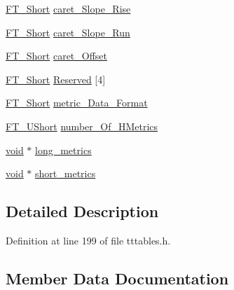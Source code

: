 \begin{DoxyCompactItemize}
\mbox{\hyperlink{fttypes_8h_aa7279be89046a2563cd3d4d6651fbdcf}{F\+T\+\_\+\+Short}} \mbox{\hyperlink{struct_t_t___hori_header___aeb43d92f56de424d8f28bd389973eca4}{caret\+\_\+\+Slope\+\_\+\+Rise}}
\item 
\mbox{\hyperlink{fttypes_8h_aa7279be89046a2563cd3d4d6651fbdcf}{F\+T\+\_\+\+Short}} \mbox{\hyperlink{struct_t_t___hori_header___acce162ae0554006c11a3383bd3454d69}{caret\+\_\+\+Slope\+\_\+\+Run}}
\item 
\mbox{\hyperlink{fttypes_8h_aa7279be89046a2563cd3d4d6651fbdcf}{F\+T\+\_\+\+Short}} \mbox{\hyperlink{struct_t_t___hori_header___a791ad767d54cc87e84d9b03d6739f0eb}{caret\+\_\+\+Offset}}
\item 
\mbox{\hyperlink{fttypes_8h_aa7279be89046a2563cd3d4d6651fbdcf}{F\+T\+\_\+\+Short}} \mbox{\hyperlink{struct_t_t___hori_header___af2a2b374d8f81771fb75d3bdc96bcbf7}{Reserved}} \mbox{[}4\mbox{]}
\item 
\mbox{\hyperlink{fttypes_8h_aa7279be89046a2563cd3d4d6651fbdcf}{F\+T\+\_\+\+Short}} \mbox{\hyperlink{struct_t_t___hori_header___a0ed857e9629d2dfb5350a6b5976bf933}{metric\+\_\+\+Data\+\_\+\+Format}}
\item 
\mbox{\hyperlink{fttypes_8h_a937f6c17cf5ffd09086d8610c37b9f58}{F\+T\+\_\+\+U\+Short}} \mbox{\hyperlink{struct_t_t___hori_header___aac3ecb9ba7c13436a663b91765e89647}{number\+\_\+\+Of\+\_\+\+H\+Metrics}}
\item 
\mbox{\hyperlink{_s_d_l__opengles2__gl2ext_8h_ae5d8fa23ad07c48bb609509eae494c95}{void}} $\ast$ \mbox{\hyperlink{struct_t_t___hori_header___a3eeb5766b461e9563b659a30e775fcc2}{long\+\_\+metrics}}
\item 
\mbox{\hyperlink{_s_d_l__opengles2__gl2ext_8h_ae5d8fa23ad07c48bb609509eae494c95}{void}} $\ast$ \mbox{\hyperlink{struct_t_t___hori_header___ae39107c4cfc3e7c1871dbb304bbe4a5a}{short\+\_\+metrics}}
\end{DoxyCompactItemize}


\subsection{Detailed Description}


Definition at line 199 of file tttables.\+h.



\subsection{Member Data Documentation}
\mbox{\label{struct_t_t___hori_header___a1ddad7e4c5e6fed50c073745961814da}} 
